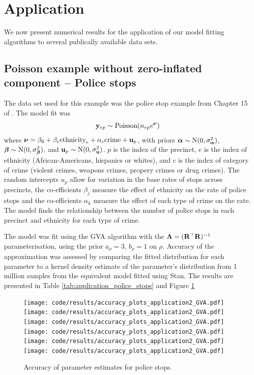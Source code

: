 \section{Application}
We now present numerical results for the application of our model fitting
algorithms to several publically available data sets.

\label{sec:application}

\subsection{Poisson example without zero-inflated component -- Police stops}
\label{sec:police_stops}
The data set used for this example was the police stop example from Chapter 15 of \cite{Gelman2007}.
The model fit was
\begin{equation*}
	{\bf y}_{ep}        \sim \text{Poisson}(n_{ep} e^{\boldsymbol \nu})
\end{equation*}
\noindent where ${\boldsymbol \nu} = {\beta_0 + \beta_e \text{ethnicity}_e + \alpha_{c} \text{crime} + {\bf u}_p}$, with priors
	${\boldsymbol \alpha} \sim \text{N}(0, \sigma_{\boldsymbol \alpha}^2)$,	
	${\boldsymbol \beta} \sim \text{N}(0, \sigma_{\boldsymbol \beta}^2)$, and
	${\bf u}_p \sim \text{N}(0, \sigma_{\bf u}^2)$.
$p$ is the index of the precinct, $e$ is the index of ethnicity
(African-Americans, hispanics or whites), and $c$ is the index of category of
crime (violent crimes, weapons crimes, propery crimes or drug crimes). The
random intercepts $u_p$ allow for variation in the base rates of stops across
precincts, the co-efficients $\beta_j$ measure the effect of ethnicity on the
rate of police stops and the co-efficients $\alpha_k$ measure the effect of
each type of crime on the rate. The model finds the relationship between the
number of police stops in each precinct and  ethnicity for each type of crime.

The model was fit using the GVA algorithm with the ${\boldsymbol \Lambda} = ({\bf R}^\top
{\bf R})^{-1}$ parameterisation, using the prior $a_\rho = 3$, $b_\rho = 1$ on
$\rho$. Accuracy of the approximation was assessed by comparing the fitted
distribution for each parameter to a kernel density estimate of the parameter's
distribution from 1 million samples from the equivalent model fitted using
Stan. The results are presented in Table \ref{tab:application_police_stops} and
Figure \ref{fig:police_stops}

\begin{figure}
\centering
  \texttt{[image: code/results/accuracy\_plots\_application2\_GVA.pdf]}
  \texttt{[image: code/results/accuracy\_plots\_application2\_GVA.pdf]}
  \texttt{[image: code/results/accuracy\_plots\_application2\_GVA.pdf]}
  \texttt{[image: code/results/accuracy\_plots\_application2\_GVA.pdf]}
  \texttt{[image: code/results/accuracy\_plots\_application2\_GVA.pdf]}
  \texttt{[image: code/results/accuracy\_plots\_application2\_GVA.pdf]}
\caption{Accuracy of parameter estimates for police stops.}
\label{fig:police_stops}
\end{figure}

